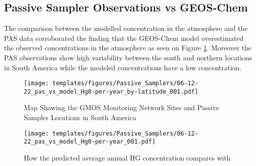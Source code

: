 \subsection{Passive Sampler Observations vs GEOS-Chem}
\begin{flushleft}
 The comparison between the modelled concentration in the atmosphere and the PAS data corroborated the finding that the GEOS-Chem model overestimated the observed concentrations in the atmosphere as seen on Figure \ref{fig:06-12-22_pas_vs_model_Hg0-per-year_by-latitude_001}. Moreover the PAS observations show high variability between the south and northern locations in South America while the modeled concentrations have a low concentration. 
\end{flushleft}


\begin{figure}[H]
  \texttt{[image: templates/figures/Passive\_Samplers/06-12-22\_pas\_vs\_model\_Hg0-per-year\_by-latitude\_001.pdf]}
  \caption{Map Showing the GMOS Monitoring Network Sites and Passive Sampler Locations in South America}
  \label{fig:06-12-22_pas_vs_model_Hg0-per-year_by-latitude_001}
  \centering
  
\end{figure}
\FloatBarrier

\begin{figure}[H]
  \texttt{[image: templates/figures/Passive\_Samplers/06-12-22\_pas\_vs\_model\_Hg0-per-year\_001.pdf]}
  \caption{How the predicted average annual HG concentration compares with   }
  \label{fig:06-12-22_pas_vs_model_Hg0-per-year_001}
  \centering
  
\end{figure}
\FloatBarrier

